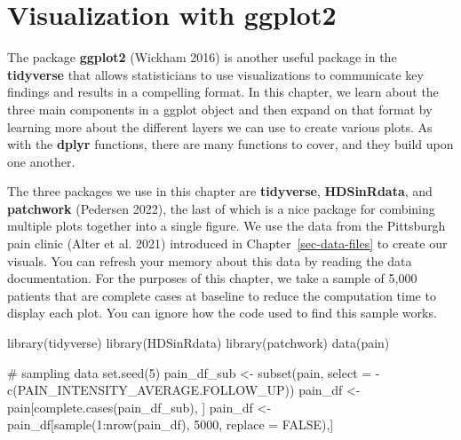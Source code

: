 \documentclass[
  letterpaper,
]{latex/krantz}
\makeatletter
\newenvironment{Shaded}{\begin{snugshade}}{\end{snugshade}}
\newcommand{\AttributeTok}[1]{\textcolor[rgb]{0.40,0.45,0.13}{#1}}
\newcommand{\CommentTok}[1]{\textcolor[rgb]{0.37,0.37,0.37}{#1}}
\newcommand{\ConstantTok}[1]{\textcolor[rgb]{0.56,0.35,0.01}{#1}}
\newcommand{\DecValTok}[1]{\textcolor[rgb]{0.68,0.00,0.00}{#1}}
\newcommand{\FunctionTok}[1]{\textcolor[rgb]{0.28,0.35,0.67}{#1}}
\newcommand{\NormalTok}[1]{\textcolor[rgb]{0.00,0.23,0.31}{#1}}
\newcommand{\OtherTok}[1]{\textcolor[rgb]{0.00,0.23,0.31}{#1}}
\newcommand{\SpecialCharTok}[1]{\textcolor[rgb]{0.37,0.37,0.37}{#1}}
\newenvironment{kframe}{%
\medskip{}
\setlength{\fboxsep}{.8em}
 \def\at@end@of@kframe{}%
 \ifinner\ifhmode%
  \def\at@end@of@kframe{\end{minipage}}%
  \begin{minipage}{\columnwidth}%
 \fi\fi%
 \def\FrameCommand##1{\hskip\@totalleftmargin \hskip-\fboxsep
 \colorbox{shadecolor}{##1}\hskip-\fboxsep
     \hskip-\linewidth \hskip-\@totalleftmargin \hskip\columnwidth}%
 \MakeFramed {\advance\hsize-\width
   \@totalleftmargin\z@ \linewidth\hsize
   \@setminipage}}%
 {\par\unskip\endMakeFramed%
 \at@end@of@kframe}
\renewenvironment{Shaded}{\begin{kframe}}{\end{kframe}}
\makeatother
\begin{document}
\chapter{Visualization with ggplot2}\label{sec-ggplot2}

The package \textbf{ggplot2} (Wickham 2016) 
is another useful package in the
\textbf{tidyverse} that allows statisticians
to use visualizations to communicate key findings and results in a
compelling format. In this chapter, we learn about the three main
components in a ggplot object and then expand on that format by learning
more about the different layers we can use to create various plots. As
with the \textbf{dplyr} functions, there are many functions to cover,
and they build upon one another.

The three packages we use in this chapter are \textbf{tidyverse},
\textbf{HDSinRdata}, and
\textbf{patchwork} (Pedersen 2022), the last
of which is a nice package for combining multiple plots together into a
single figure. We use the data from the Pittsburgh pain clinic (Alter et
al. 2021)  introduced in
Chapter~\ref{sec-data-files} to create our visuals. You can refresh your
memory about this data by reading the data documentation. For the
purposes of this chapter, we take a sample of 5,000 patients that are
complete cases at baseline to reduce the computation time to display
each plot. You can ignore how the code used to find this sample works.

\begin{Shaded}
\begin{Highlighting}[]
\FunctionTok{library}\NormalTok{(tidyverse)}
\FunctionTok{library}\NormalTok{(HDSinRdata)}
\FunctionTok{library}\NormalTok{(patchwork)}
\FunctionTok{data}\NormalTok{(pain)}

\CommentTok{\# sampling data}
\FunctionTok{set.seed}\NormalTok{(}\DecValTok{5}\NormalTok{)}
\NormalTok{pain\_df\_sub }\OtherTok{\textless{}{-}} \FunctionTok{subset}\NormalTok{(pain, }
                      \AttributeTok{select =} \SpecialCharTok{{-}}\FunctionTok{c}\NormalTok{(PAIN\_INTENSITY\_AVERAGE.FOLLOW\_UP))}
\NormalTok{pain\_df }\OtherTok{\textless{}{-}}\NormalTok{ pain[}\FunctionTok{complete.cases}\NormalTok{(pain\_df\_sub), ]}
\NormalTok{pain\_df }\OtherTok{\textless{}{-}}\NormalTok{ pain\_df[}\FunctionTok{sample}\NormalTok{(}\DecValTok{1}\SpecialCharTok{:}\FunctionTok{nrow}\NormalTok{(pain\_df), }\DecValTok{5000}\NormalTok{, }\AttributeTok{replace =} \ConstantTok{FALSE}\NormalTok{),] }
\end{Highlighting}
\end{Shaded}
\end{document}
